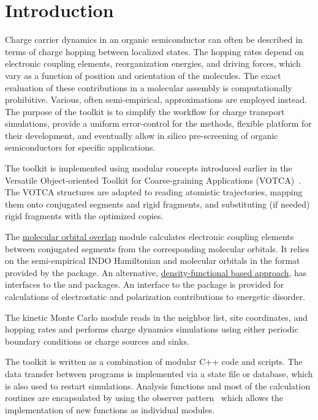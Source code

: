 \chapter{Introduction}
\label{sec:introduction}

Charge carrier dynamics in an organic semiconductor can often be described in terms of charge hopping between localized states. The hopping rates depend on electronic coupling elements, reorganization energies, and driving forces, which vary as a function of position and orientation of the molecules.  The exact evaluation of these contributions in a molecular assembly is computationally prohibitive. Various, often semi-empirical, approximations are employed instead. The purpose of the toolkit is to simplify the workflow for charge transport simulations, provide a uniform error-control for the methods, flexible platform for their development, and eventually allow in silico pre-screening of organic semiconductors for specific applications. 

The toolkit is implemented using modular concepts introduced earlier in the Versatile Object-oriented Toolkit for Coarse-graining Applications (VOTCA)~\cite{ruehle_versatile_2009}. The VOTCA structures are adapted to reading atomistic trajectories, mapping them onto conjugated segments and rigid fragments, and substituting (if needed) rigid fragments with the optimized copies. 

The \hyperref[sec:moo]{molecular orbital overlap} module calculates electronic coupling elements between  conjugated segments from the corresponding molecular orbitals. It relies on the semi-empirical INDO Hamiltonian and molecular orbitals in the format provided by the \gaussian package. An alternative,  \hyperref[sec:dft]{density-functional based approach}, has interfaces to the \gaussian and \turbomole packages. An interface to the \tinker package is provided for calculations of electrostatic and polarization contributions to energetic disorder. 

The kinetic Monte Carlo module reads in the neighbor list, site coordinates, and hopping rates and performs charge dynamics simulations using either periodic boundary conditions or charge sources and sinks. 

The toolkit is written as a combination of modular C++ code and scripts. The data transfer between programs is implemented via a state file or database, which is also used to restart simulations. Analysis functions and most of the calculation routines are encapsulated by using the observer pattern~\cite{gamma_design_1995} which allows the implementation of new functions as individual modules.
